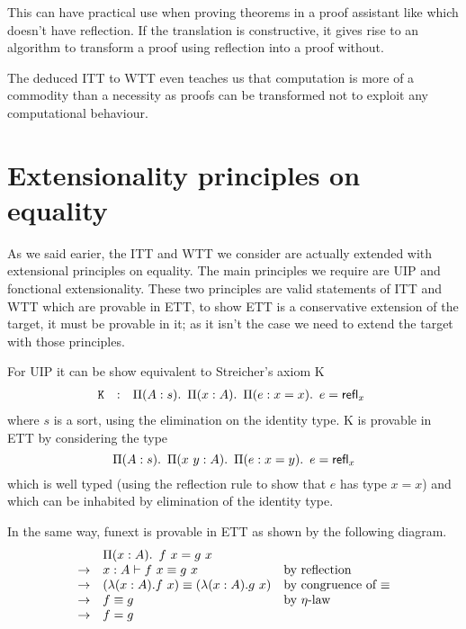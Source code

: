 This can have practical use when proving theorems in a proof assistant like \Coq
which doesn't have reflection. If the translation is constructive, it gives
rise to an algorithm to transform a proof using reflection into a proof without.

The deduced \acrshort{ITT} to \acrshort{WTT} even teaches us that computation
is more of a commodity than a necessity as proofs can be transformed not to
exploit any computational behaviour.

\section{Extensionality principles on equality}

As we said earier, the \acrshort{ITT} and \acrshort{WTT} we consider are
actually extended with extensional principles on equality.
The main principles we require are \acrshort{UIP} and fonctional extensionality.
These two principles are valid statements of \acrshort{ITT} and \acrshort{WTT}
which are provable in \acrshort{ETT}, to show \acrshort{ETT} is a conservative
extension of the target, it must be provable in it; as it isn't the case we need
to extend the target with those principles.

For \acrshort{UIP} it can be show equivalent to Streicher's axiom K
\[
\begin{array}{rcl}
  \mathtt{K} & : & \mathop{\Pi(A: s).\ } \mathop{\Pi(x :A).\ } \mathop{\Pi(e : x = x).\ } e = {\mathsf{refl}}_{x}\  \\
\end{array}
\]
where \(s\) is a sort, using the elimination on the identity type.
K is provable in \acrshort{ETT} by considering the type
\[
  \mathop{\Pi(A: s).\ } \mathop{\Pi(x \ y:A).\ } \mathop{\Pi(e : x = y).\ } e = {\mathsf{refl}}_{x}\  \\
\]
which is well typed (using the reflection rule to show that $e$ has
type $x= x$) and which can be inhabited by elimination of the identity
type.

In the same way, \acrshort{funext} is provable in \acrshort{ETT} as shown by the
following diagram.
\[
\begin{array}{cll}
  &\mathop{\Pi(x : A).\ } f\ x = g\ x \\
  \to & x : A \vdash f\ x \equiv g\ x &
  \mbox{by reflection} \\
  \to &  (\lambda (x:A). {f \ x}) \equiv (\lambda{(x:A)}.{g \ x}) &
  \mbox{by congruence of $\equiv$} \\
  \to &  f \equiv g & \mbox{by $\eta$-law} \\
  \to &  f = g
\end{array}
\]

